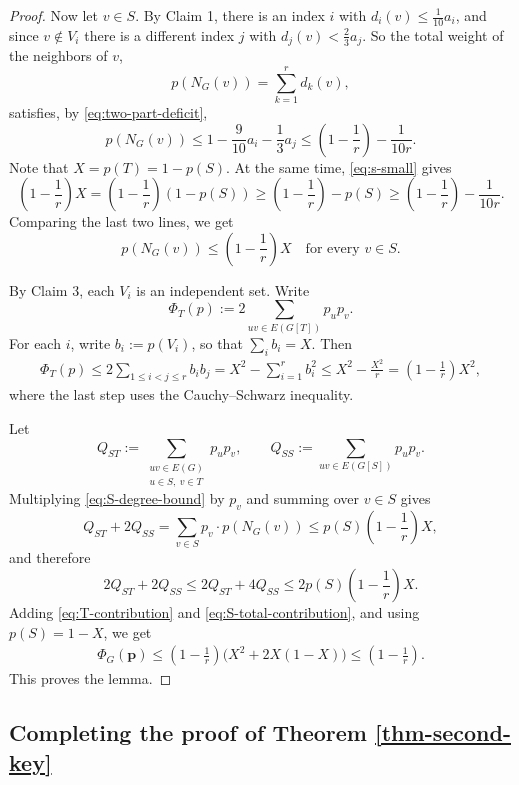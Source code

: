\documentclass[11pt, a4paper]{article}
\theoremstyle{definition}
\theoremstyle{plain}
\renewcommand{\le}{\leqslant}
\renewcommand{\ge}{\geqslant}
\begin{document}
\begin{proof}
Now let $v\in S$. By Claim 1, there is an index
$i$ with $d_i(v)\le \frac{1}{10}a_i$, and since
$v\notin V_i$ there is a different index $j$
with $d_j(v)<\frac23a_j$. So the total weight of
the neighbors of $v$,
\[
p(N_G(v))=\sum_{k=1}^r d_k(v),
\]
satisfies, by \eqref{eq:two-part-deficit},
\[
p(N_G(v)) 
  \le 1-\frac{9}{10}a_i-\frac13a_j
  \le \left(1-\frac{1}{r}\right)-\frac{1}{10r}.
\]
Note that $X=p(T)=1-p(S)$. 
At the same time, \eqref{eq:s-small} gives
\[
  \left(1-\frac{1}{r}\right)X
  =\left(1-\frac{1}{r}\right)(1-p(S))
  \ge \left(1-\frac{1}{r}\right)- p(S)
  \ge \left(1-\frac{1}{r}\right)-\frac{1}{10r}.
\]
Comparing the last two lines, we get
\begin{equation}\label{eq:S-degree-bound}
   p(N_G(v)) \le \left(1-\frac{1}{r}\right) X
  \quad\text{for every }v\in S.
\end{equation}

 By Claim 3, each $V_i$ is an independent set. Write
$$\Phi_{T}(p) :=2\sum_{uv\in E(G[T])}p_up_v.$$ 
For each $i$, write $b_i:=p(V_i)$, so that
$\sum_i b_i=X$. Then
\begin{align}
\Phi_{T}(p)
  \le 2\sum_{1\le i<j\le r}b_ib_j
  =X^2-\sum_{i=1}^r b_i^2
  \le X^2-\frac{X^2}{r}
   =\left(1-\frac{1}{r}\right) X^2,
  \label{eq:T-contribution}
\end{align}
where the last step uses the Cauchy--Schwarz inequality.

Let
\[ Q_{ST}:=\sum_{\substack{uv\in E(G)\\
    u\in S,\ v\in T}}p_up_v,
  \qquad
  Q_{SS}:=\sum_{uv\in E(G[S])}p_up_v.
\]
Multiplying \eqref{eq:S-degree-bound} by $p_v$
and summing over $v\in S$ gives
\[
  Q_{ST}+2Q_{SS}
  =\sum_{v\in S}p_v\cdot p(N_G(v)) 
  \le p(S) \left(1-\frac{1}{r}\right) X ,
\]
and therefore
\begin{equation}\label{eq:S-total-contribution}
  2Q_{ST}+2Q_{SS}
  \le 2Q_{ST}+4Q_{SS}
  \le 2 p(S) \left(1-\frac{1}{r}\right) X.
\end{equation}
Adding \eqref{eq:T-contribution} and
\eqref{eq:S-total-contribution}, and using $p(S)=1-X$, we get
\begin{align*}
  \Phi_G(\bm{p})
  \le \left(1-\frac{1}{r}\right)
    \bigl(X^2+2X(1-X)\bigr) 
  \le \left(1-\frac{1}{r}\right).
\end{align*}
This proves the lemma.
\end{proof}



\subsection{Completing the proof of Theorem \ref{thm-second-key}} 
\end{document}
